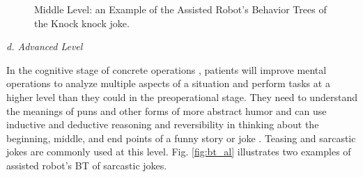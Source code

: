 \documentclass[letterpaper]{article} %
\begin{document}
\begin{figure}
\centering
{}
 \caption{Middle Level: an Example of the Assisted Robot's Behavior Trees of the Knock knock joke.}
 \label{fig:bt_ml}
 \end{figure}

\textit{d. Advanced Level}

In the cognitive stage of concrete operations \cite{papalia2007human}, patients will improve mental operations to analyze multiple aspects of a situation and perform tasks at a higher level than they could in the preoperational stage. They need to understand the meanings of puns and other forms of more abstract humor and can use inductive and deductive reasoning and reversibility in thinking about the beginning, middle, and end points of a funny story or joke \cite{southam2005humor}. Teasing and sarcastic jokes are commonly used at this level. Fig. \ref{fig:bt_al} illustrates two examples of assisted robot's BT of sarcastic jokes.
\end{document}
